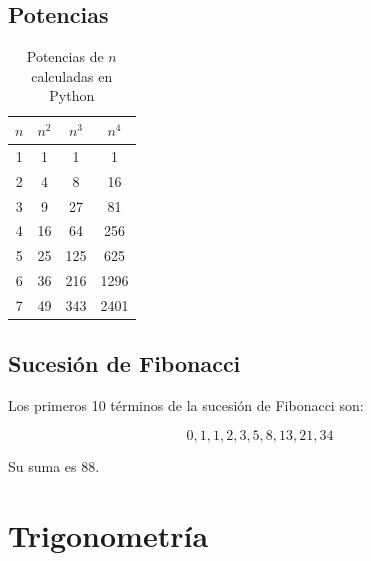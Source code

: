 \documentclass[12pt, a4paper]{article}
\begin{document}
\subsection{Potencias}

\begin{table}[h]
  \centering
  \caption{Potencias de $n$ calculadas en Python}
  \begin{tabular}{c c c c}
    \toprule
    $n$ & $n^2$ & $n^3$ & $n^4$ \\
    \midrule
    1 & 1 & 1 & 1 \\
    2 & 4 & 8 & 16 \\
    3 & 9 & 27 & 81 \\
    4 & 16 & 64 & 256 \\
    5 & 25 & 125 & 625 \\
    6 & 36 & 216 & 1296 \\
    7 & 49 & 343 & 2401 \\
    \bottomrule
  \end{tabular}
\end{table}

\subsection{Sucesión de Fibonacci}

Los primeros 10 términos de la sucesión de Fibonacci son:

\[
  0, 1, 1, 2, 3, 5, 8, 13, 21, 34
\]

Su suma es $88$.


\section{Trigonometría}

%
%
%
%
\end{document}

